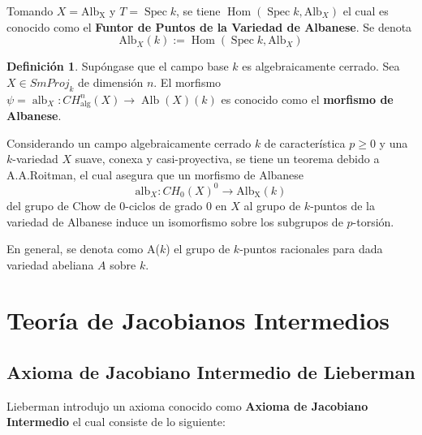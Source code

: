 \documentclass[10pt]{amsart}
\theoremstyle{definition}
\newtheorem{definition}{Definici\'on}[section]
\theoremstyle{remark}
\theoremstyle{definition}
\begin{document}
Tomando $X= \mathrm{Alb_{X}}$ y $T=\operatorname{Spec}{\mathit{k}}$, se tiene $\operatorname{Hom}(\operatorname{Spec}{\mathit{k}}, \mathrm{Alb}_{X})$ el cual es conocido como el \textbf{Funtor de Puntos de la Variedad de Albanese}.
Se denota 
\begin{equation*}
 \mathrm{Alb}_{X}(\mathit{k}):=\operatorname{Hom}(\operatorname{Spec}{\mathit{k}}, \mathrm{Alb}_{X})
\end{equation*}

\begin{definition}
Supóngase que el campo base $k$ es algebraicamente cerrado. Sea $X\in SmProj_{k}$ de dimensión $n$. El morfismo $\psi=\operatorname{alb}_{X}:CH^{n}_{\operatorname{alg}}(X)\to\operatorname{Alb}(X)(k)$ es conocido como el \textbf{morfismo de Albanese}.
\end{definition}

Considerando un campo algebraicamente cerrado $\mathit{k}$ de característica $p \geq 0$ y una $\mathit{k}$-variedad $X$ suave, conexa y casi-proyectiva, se tiene un teorema debido a A.A.Roitman, el cual asegura que un morfismo de Albanese
\begin{equation*}
\mathrm{alb}_{X}:CH_{0}(X)^{0} \rightarrow \mathrm{Alb_{X}}(\mathit{k})
\end{equation*}
del grupo de Chow de $0$-ciclos de grado $0$ en $X$ al grupo de $\mathit{k}$-puntos de la variedad de Albanese induce un isomorfismo sobre los subgrupos de $p$-torsión.

En general, se denota como A($\mathit{k}$) el grupo de $\mathit{k}$-puntos racionales para dada variedad abeliana $A$ sobre $\mathit{k}$.


\section{Teoría de Jacobianos Intermedios}

\subsection{Axioma de Jacobiano Intermedio de Lieberman}


 Lieberman introdujo un axioma conocido como \textbf{Axioma de Jacobiano Intermedio} el cual consiste de lo siguiente:
\end{document}
